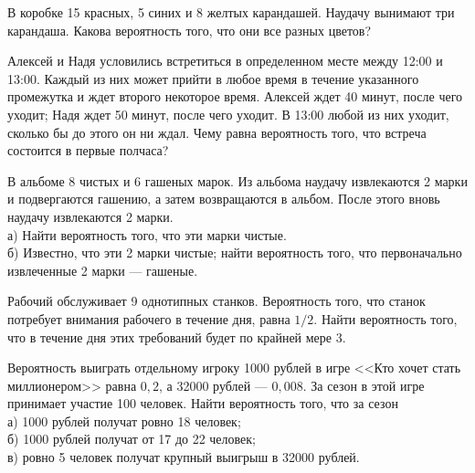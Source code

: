 \newpage\setcounter{zad}{0}



\begin{zkrW}{20}\noindent 
	В коробке 15 красных, 5 синих и 8 желтых карандашей. Наудачу вынимают три карандаша. Какова вероятность того, что они все разных цветов?
 
\end{zkrW}

\begin{zkrW}{20}\noindent 
	Алексей и Надя условились встретиться в определенном месте между 12:00 и 13:00. Каждый из них может прийти в любое время в течение указанного промежутка и ждет второго некоторое время. Алексей ждет 40 минут, после чего уходит; Надя ждет 50 минут, после чего уходит. В 13:00 любой из них уходит, сколько бы до этого он ни ждал. Чему равна вероятность того, что встреча состоится в первые полчаса?
 
\end{zkrW}

\begin{zkrW}{20}\noindent 
	В альбоме 8 чистых и 6 гашеных марок. Из альбома наудачу извлекаются 2 марки и подвергаются гашению, а затем возвращаются в альбом. После этого вновь наудачу извлекаются 2 марки. \\ \indent а) Найти вероятность того, что эти марки чистые. \\ \indent б) Известно, что эти 2 марки чистые; найти вероятность того, что первоначально извлеченные 2 марки --- гашеные.
 
\end{zkrW}

\begin{zkrW}{20}\noindent 
	Рабочий обслуживает 9 однотипных станков. Вероятность того, что станок потребует внимания рабочего в течение дня, равна $1/2$. Найти вероятность того, что в течение дня этих требований будет по крайней мере 3.
 
\end{zkrW}

\begin{zkrW}{20}\noindent 
	Вероятность выиграть отдельному игроку 1000 рублей в игре <<Кто хочет стать миллионером>> равна $0{,}2$, а 32000 рублей --- $0{,}008$. За сезон в этой игре принимает участие 100 человек. Найти вероятность того, что за сезон \\ \indent а) 1000 рублей получат ровно 18 человек; \\ \indent б) 1000 рублей получат от 17 до 22 человек; \\ \indent в) ровно 5 человек получат крупный выигрыш в 32000 рублей.
 
\end{zkrW}

